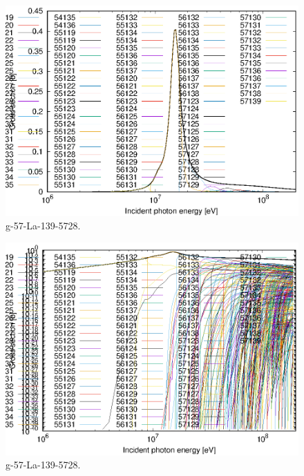 \begin{figure}
 \includegraphics[width=\linewidth]{eps/g_57-La-139_5728.eps}
  \caption{g-57-La-139-5728.}
\end{figure}
\begin{figure}
 \includegraphics[width=\linewidth]{eps-log/g_57-La-139_5728.eps}
 \caption{g-57-La-139-5728.}
\end{figure}
\newpage \clearpage

